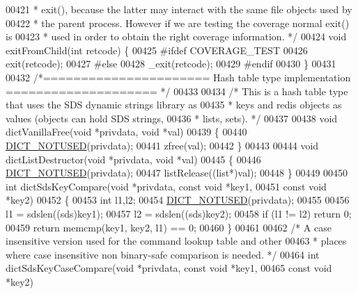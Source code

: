 \begin{DoxyCode}
{{{{{00421 \textcolor{comment}{ * exit(), because the latter may interact with the same file objects used by}
00422 \textcolor{comment}{ * the parent process. However if we are testing the coverage normal exit() is}
00423 \textcolor{comment}{ * used in order to obtain the right coverage information. */}
00424 \textcolor{keywordtype}{void} exitFromChild(\textcolor{keywordtype}{int} retcode) \{
00425 \textcolor{preprocessor}{#}\textcolor{preprocessor}{ifdef} \textcolor{preprocessor}{COVERAGE\_TEST}
00426     exit(retcode);
00427 \textcolor{preprocessor}{#}\textcolor{preprocessor}{else}
00428     \_exit(retcode);
00429 \textcolor{preprocessor}{#}\textcolor{preprocessor}{endif}
00430 \}
00431 
00432 \textcolor{comment}{/*====================== Hash table type implementation  ==================== */}
00433 
00434 \textcolor{comment}{/* This is a hash table type that uses the SDS dynamic strings library as}
00435 \textcolor{comment}{ * keys and redis objects as values (objects can hold SDS strings,}
00436 \textcolor{comment}{ * lists, sets). */}
00437 
00438 \textcolor{keywordtype}{void} dictVanillaFree(\textcolor{keywordtype}{void} *privdata, \textcolor{keywordtype}{void} *val)
00439 \{
00440     \hyperlink{dict_8h_aa077e877a37a7dc65056290a2c9760da}{DICT\_NOTUSED}(privdata);
00441     zfree(val);
00442 \}
00443 
00444 \textcolor{keywordtype}{void} dictListDestructor(\textcolor{keywordtype}{void} *privdata, \textcolor{keywordtype}{void} *val)
00445 \{
00446     \hyperlink{dict_8h_aa077e877a37a7dc65056290a2c9760da}{DICT\_NOTUSED}(privdata);
00447     listRelease((list*)val);
00448 \}
00449 
00450 \textcolor{keywordtype}{int} dictSdsKeyCompare(\textcolor{keywordtype}{void} *privdata, \textcolor{keyword}{const} \textcolor{keywordtype}{void} *key1,
00451         \textcolor{keyword}{const} \textcolor{keywordtype}{void} *key2)
00452 \{
00453     \textcolor{keywordtype}{int} l1,l2;
00454     \hyperlink{dict_8h_aa077e877a37a7dc65056290a2c9760da}{DICT\_NOTUSED}(privdata);
00455 
00456     l1 = sdslen((sds)key1);
00457     l2 = sdslen((sds)key2);
00458     \textcolor{keywordflow}{if} (l1 != l2) \textcolor{keywordflow}{return} 0;
00459     \textcolor{keywordflow}{return} memcmp(key1, key2, l1) == 0;
00460 \}
00461 
00462 \textcolor{comment}{/* A case insensitive version used for the command lookup table and other}
00463 \textcolor{comment}{ * places where case insensitive non binary-safe comparison is needed. */}
00464 \textcolor{keywordtype}{int} dictSdsKeyCaseCompare(\textcolor{keywordtype}{void} *privdata, \textcolor{keyword}{const} \textcolor{keywordtype}{void} *key1,
00465         \textcolor{keyword}{const} \textcolor{keywordtype}{void} *key2)
}}}}}
\end{DoxyCode}
